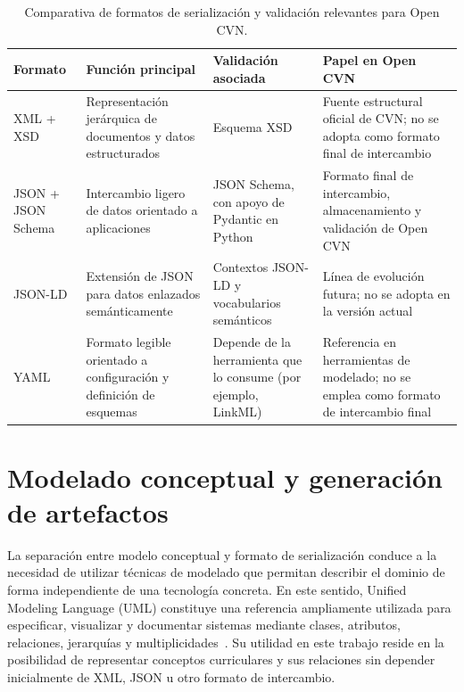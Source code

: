 \begin{table}[htbp]
  \centering
  \footnotesize
  \renewcommand{\arraystretch}{1.55}
  \caption{Comparativa de formatos de serialización y validación relevantes para Open CVN.}
  \label{tab:estado_arte_formatos_serializacion}
  \begin{tabular}{p{} p{} p{} p{}}
    \hline
    \textbf{Formato} & \textbf{Función principal} & \textbf{Validación asociada} & \textbf{Papel en Open CVN} \\
    \hline
    XML + XSD & Representación jerárquica de documentos y datos estructurados & Esquema XSD & Fuente estructural oficial de CVN; no se adopta como formato final de intercambio \\
    JSON + JSON Schema & Intercambio ligero de datos orientado a aplicaciones & JSON Schema, con apoyo de Pydantic en Python & Formato final de intercambio, almacenamiento y validación de Open CVN \\
    JSON-LD & Extensión de JSON para datos enlazados semánticamente & Contextos JSON-LD y vocabularios semánticos & Línea de evolución futura; no se adopta en la versión actual \\
    YAML & Formato legible orientado a configuración y definición de esquemas & Depende de la herramienta que lo consume (por ejemplo, LinkML) & Referencia en herramientas de modelado; no se emplea como formato de intercambio final \\
    \hline
  \end{tabular}
\end{table}

\section{Modelado conceptual y generación de artefactos}
\label{sec:estado_arte_modelado}

La separación entre modelo conceptual y formato de serialización conduce a la
necesidad de utilizar técnicas de modelado que permitan describir el dominio de
forma independiente de una tecnología concreta. En este sentido, Unified Modeling
Language (UML) constituye una referencia ampliamente utilizada para especificar,
visualizar y documentar sistemas mediante clases, atributos, relaciones,
jerarquías y multiplicidades~\cite{omg_uml}. Su utilidad en este trabajo reside
en la posibilidad de representar conceptos curriculares y sus relaciones sin
depender inicialmente de XML, JSON u otro formato de intercambio.

